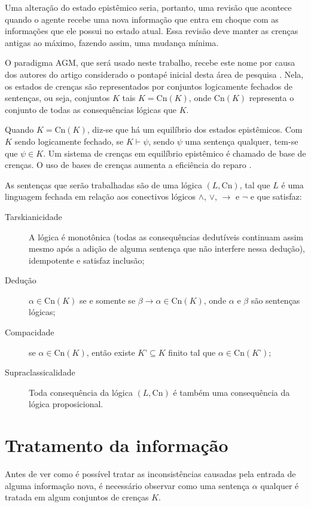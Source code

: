 Uma alteração do estado epistêmico seria, portanto, uma revisão que acontece quando o agente recebe uma nova informação que entra em choque com as informações que ele possui no estado atual. Essa revisão deve manter as crenças antigas ao máximo, fazendo assim, uma mudança mínima.

O paradigma AGM, que será usado neste trabalho, recebe este nome por causa dos autores do artigo considerado o pontapé inicial desta área de pesquisa \cite{revisaoAGM}. Nela, os estados de crenças são representados por conjuntos logicamente fechados de sentenças, ou seja, conjuntos $ K $ tais $ K = \text{Cn}(K) $, onde $ \text{Cn}(K) $ representa o conjunto de todas as consequências lógicas que $ K $. 

Quando $ K = \text{Cn}(K) $, diz-se que há um equilíbrio dos estados epistêmicos. Com $ K $ sendo logicamente fechado, se $ K \vdash \psi $, sendo $ \psi $ uma sentença qualquer, tem-se que $ \psi \in K $. Um sistema de crenças em equilíbrio epistêmico é chamado de base de crenças.  O uso de bases de crenças aumenta a eficiência do reparo \cite{revisaoHansson}.

As sentenças que serão trabalhadas são de uma lógica $ (L, \text{Cn}) $, tal que $ L $ é uma linguagem fechada em relação aos conectivos lógicos $ \land $, $ \lor $, $ \to $ e $ \lnot $ e que satisfaz:

\begin{description}
	\item[Tarskianicidade] A lógica é monotônica (todas as consequências dedutíveis continuam assim mesmo após a adição de alguma sentença que não interfere nessa dedução), idempotente e satisfaz inclusão;
	\item[Dedução] $ \alpha \in \text{Cn}(K) $ se e somente se $ \beta \to \alpha \in \text{Cn}(K) $, onde $ \alpha $ e $ \beta $ são sentenças lógicas;
	\item[Compacidade] se $ \alpha \in \text{Cn}(K) $, então existe $ K’ \subseteq K $ finito tal que $ \alpha \in \text{Cn}(K’) $;
	\item[Supraclassicalidade] Toda consequência da lógica $ (L, \text{Cn}) $ é também uma consequência da lógica proposicional.
\end{description} 

\section{Tratamento da informação}

Antes de ver como é possível tratar as inconsistências causadas pela entrada de alguma informação nova, é necessário observar como uma sentença $ \alpha $ qualquer é tratada em algum conjuntos de crenças $ K $.

